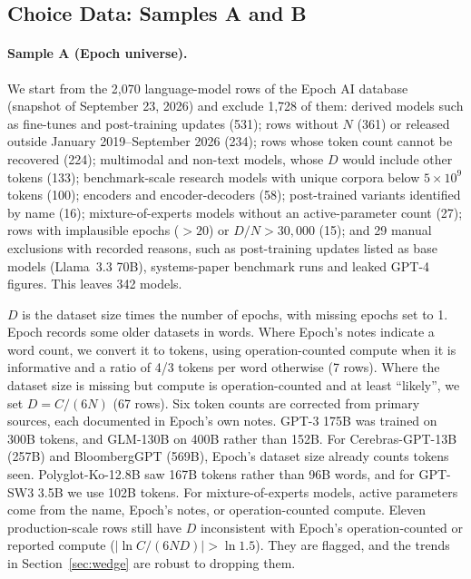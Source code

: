 \subsection{Choice Data: Samples A and B}\label{app:choices}

\paragraph{Sample A (Epoch universe).}
We start from the 2,070 language-model rows of the Epoch AI database \citep{epochai2026data} (snapshot of September
23, 2026) and exclude 1,728 of them: derived models such as fine-tunes and post-training updates (531); rows without
$N$ (361) or released outside January 2019--September 2026 (234); rows whose token count cannot be recovered (224);
multimodal and non-text models, whose $D$ would include other tokens (133); benchmark-scale research models with unique
corpora below $5\times10^{9}$ tokens (100); encoders and encoder-decoders (58); post-trained variants identified by name
(16); mixture-of-experts models without an active-parameter count (27); rows with implausible epochs ($>20$) or
$D/N>30{,}000$ (15); and 29 manual exclusions with recorded reasons, such as post-training updates listed as base models
(Llama~3.3 70B), systems-paper benchmark runs and leaked GPT-4 figures. This leaves 342 models.

$D$ is the dataset size times the number of epochs, with missing epochs set to 1. Epoch records some older datasets in
words. Where Epoch's notes indicate a word count, we convert it to tokens, using operation-counted compute when it is
informative and a ratio of 4/3 tokens per word otherwise (7 rows). Where the dataset size is missing but compute is operation-counted
and at least ``likely'', we set $D=C/(6N)$ (67 rows). Six token counts are corrected from primary sources, each
documented in Epoch's own notes. GPT-3 175B was trained on 300B tokens, and GLM-130B on 400B rather than 152B. For
Cerebras-GPT-13B (257B) and BloombergGPT (569B), Epoch's dataset size already counts tokens seen. Polyglot-Ko-12.8B saw
167B tokens rather than 96B words, and for GPT-SW3 3.5B we use 102B tokens. For mixture-of-experts models, active
parameters come from the name, Epoch's notes, or operation-counted compute. Eleven production-scale rows still have $D$
inconsistent with Epoch's operation-counted or reported compute ($|\ln C/(6ND)|>\ln1.5$). They are flagged, and the
trends in Section~\ref{sec:wedge} are robust to dropping them.


